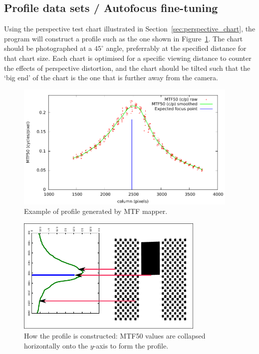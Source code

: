 \documentclass[a4paper]{article}
\begin{document}
\subsection{Profile data sets / Autofocus fine-tuning}
\label{sec:profile_mode}
Using the \textsf{perspective} test chart illustrated in
Section~\ref{sec:perspective_chart}, 
the program will construct a profile such as the one shown in 
Figure~\ref{fig:sample_profile}. 
The chart should be photographed at a $45^\circ$ angle, preferrably at the specified
distance for that chart size. Each chart is optimised for a specific viewing distance to counter
the effects of perspective distortion, and the chart should be tilted such
that the `big end' of the chart is the one that is further away from the
camera.

\begin{figure}
\centering
\includegraphics[width=0.95\textwidth]{figures/sample_profile}
\caption{Example of profile generated by MTF mapper.}
\label{fig:sample_profile}
\end{figure}

\begin{figure}
\centering
\includegraphics[width=0.8\textwidth]{figures/profile_construction}
\caption{How the profile is constructed: MTF50 values are collapsed
horizontally onto the $y$-axis to form the profile.}
\label{fig:profile_construction}
\end{figure}
\end{document}
